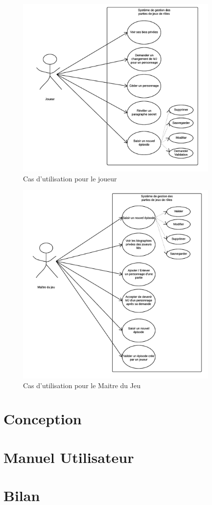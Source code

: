 \documentclass[a4paper,oneside,10pt]{article}
\begin{document}
\begin{figure}[!ht]
	\begin{center}
\includegraphics[width=10cm]{images/utilisation/JoueurCU.png}
	\caption{Cas d'utilisation pour le joueur}
\end{center}
\end{figure}
\begin{figure}[!ht]
	\begin{center}
\includegraphics[width=10cm]{images/utilisation/MJCU.png}  
	\caption{Cas d'utilisation pour le Maitre du Jeu}
\end{center}
\end{figure}
\section{Conception}


\section{Manuel Utilisateur}


\section{Bilan}
\end{document}
